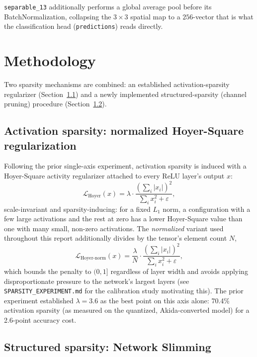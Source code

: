 \documentclass[11pt]{article}
\newcommand{\code}[1]{\texttt{#1}}
\begin{document}
\code{separable\_13} additionally performs a global average pool before its BatchNormalization, collapsing the $3\times3$ spatial map to a $256$-vector that is what the classification head (\code{predictions}) reads directly.

\section{Methodology}

Two sparsity mechanisms are combined: an established activation-sparsity regularizer (Section~\ref{sec:activation}) and a newly implemented structured-sparsity (channel pruning) procedure (Section~\ref{sec:structured}).

\subsection{Activation sparsity: normalized Hoyer-Square regularization}
\label{sec:activation}

Following the prior single-axis experiment, activation sparsity is induced with a Hoyer-Square activity regularizer \cite{deephoyer} attached to every ReLU layer's output $x$:
\begin{equation}
\mathcal{L}_{\text{Hoyer}}(x) = \lambda \cdot \frac{\left(\sum_i |x_i|\right)^2}{\sum_i x_i^2 + \varepsilon},
\end{equation}
scale-invariant and sparsity-inducing: for a fixed $L_1$ norm, a configuration with a few large activations and the rest at zero has a lower Hoyer-Square value than one with many small, non-zero activations. The \emph{normalized} variant used throughout this report additionally divides by the tensor's element count $N$,
\begin{equation}
\mathcal{L}_{\text{Hoyer-norm}}(x) = \frac{\lambda}{N} \cdot \frac{\left(\sum_i |x_i|\right)^2}{\sum_i x_i^2 + \varepsilon},
\end{equation}
which bounds the penalty to $(0,1]$ regardless of layer width and avoids applying disproportionate pressure to the network's largest layers (see \code{SPARSITY\_EXPERIMENT.md} for the calibration study motivating this). The prior experiment established $\lambda=3.6$ as the best point on this axis alone: 70.4\% activation sparsity (as measured on the quantized, Akida-converted model) for a 2.6-point accuracy cost.

\subsection{Structured sparsity: Network Slimming}
\label{sec:structured}
\end{document}
